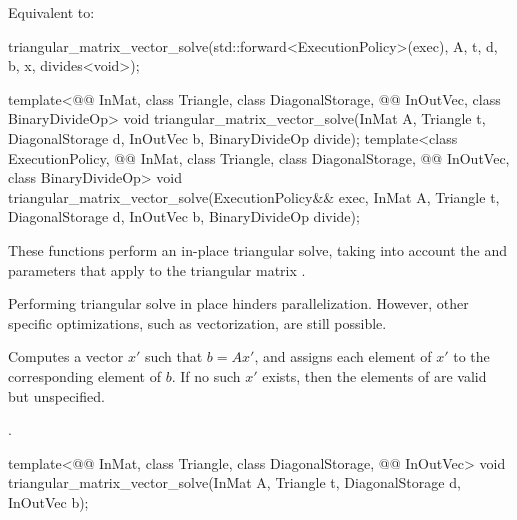 \begin{itemdescr}
\pnum
\effects
Equivalent to:
\begin{codeblock}
triangular_matrix_vector_solve(std::forward<ExecutionPolicy>(exec),
                               A, t, d, b, x, divides<void>{});
\end{codeblock}
\end{itemdescr}

%
\begin{itemdecl}
template<@@ InMat, class Triangle, class DiagonalStorage,
         @@ InOutVec, class BinaryDivideOp>
  void triangular_matrix_vector_solve(InMat A, Triangle t, DiagonalStorage d,
                                      InOutVec b, BinaryDivideOp divide);
template<class ExecutionPolicy, @@ InMat, class Triangle, class DiagonalStorage,
         @@ InOutVec, class BinaryDivideOp>
  void triangular_matrix_vector_solve(ExecutionPolicy&& exec,
                                      InMat A, Triangle t, DiagonalStorage d,
                                      InOutVec b, BinaryDivideOp divide);
\end{itemdecl}

\begin{itemdescr}
\pnum
These functions perform an in-place triangular solve,
taking into account the  and  parameters
that apply to the triangular matrix .
\begin{note}
Performing triangular solve in place hinders parallelization.
However, other  specific optimizations,
such as vectorization, are still possible.
\end{note}

\pnum
\effects
Computes a vector $x'$ such that $b = A x'$,
and assigns each element of $x'$ to the corresponding element of $b$.
If no such $x'$ exists,
then the elements of  are valid but unspecified.

\pnum
\complexity
{}.
\end{itemdescr}

%
\begin{itemdecl}
template<@@ InMat, class Triangle, class DiagonalStorage, @@ InOutVec>
  void triangular_matrix_vector_solve(InMat A, Triangle t, DiagonalStorage d, InOutVec b);
\end{itemdecl}

